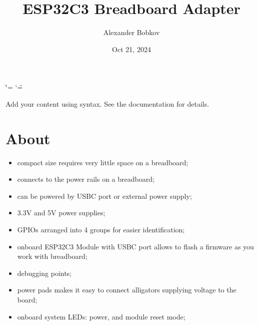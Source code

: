 \documentclass[letterpaper,10pt,english]{sphinxmanual}
\title{ESP32\sphinxhyphen{}C3 Breadboard Adapter}
\date{Oct 21, 2024}
\author{Alexander Bobkov}
\begin{document}
\ifdefined\shorthandoff
  \ifnum\catcode`\=\string=\active\shorthandoff{=}\fi
  \ifnum\catcode`\"=\active{}\fi
\fi

\pagestyle{empty}
\sphinxmaketitle
\pagestyle{plain}
\sphinxtableofcontents
\pagestyle{normal}
\label{\detokenize{index::doc}}


\sphinxAtStartPar
Add your content using  syntax. See the
documentation for details.

\sphinxstepscope


\chapter{About}
\label{\detokenize{about:about}}\label{\detokenize{about::doc}}\begin{description}
\begin{itemize}
\item {} 
\sphinxAtStartPar
compact size requires very little space on a breadboard;

\item {} 
\sphinxAtStartPar
connects to the power rails on a breadboard;

\item {} 
\sphinxAtStartPar
can be powered by USB\sphinxhyphen{}C port or external power supply;

\item {} 
\sphinxAtStartPar
3.3V and 5V power supplies;

\item {} 
\sphinxAtStartPar
GPIOs arranged into 4 groups for easier identification;

\item {} 
\sphinxAtStartPar
on\sphinxhyphen{}board ESP32\sphinxhyphen{}C3 Module with USB\sphinxhyphen{}C port allows to flash a firmware as you work with breadboard;

\item {} 
\sphinxAtStartPar
debugging points;

\item {} 
\sphinxAtStartPar
power pads makes it easy to connect alligators supplying voltage to the board;

\item {} 
\sphinxAtStartPar
on\sphinxhyphen{}board system LEDs: power, and module reset mode;


\end{itemize}
\end{description}
\end{document}
